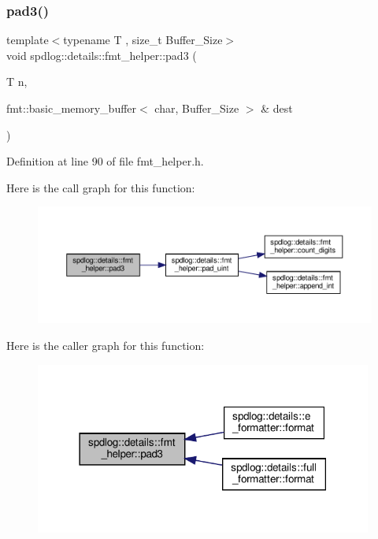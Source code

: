 \subsubsection{\texorpdfstring{pad3()}{pad3()}}
{\footnotesize\ttfamily template$<$typename T , size\+\_\+t Buffer\+\_\+\+Size$>$ \\
void spdlog\+::details\+::fmt\+\_\+helper\+::pad3 (\begin{DoxyParamCaption}\item[{T}]{n,  }\item[{fmt\+::basic\+\_\+memory\+\_\+buffer$<$ char, Buffer\+\_\+\+Size $>$ \&}]{dest }\end{DoxyParamCaption})\hspace{0.3cm}{\ttfamily [inline]}}



Definition at line 90 of file fmt\+\_\+helper.\+h.

Here is the call graph for this function\+:
\nopagebreak
\begin{figure}[H]
\begin{center}
\leavevmode
\includegraphics[width=350pt]{namespacespdlog_1_1details_1_1fmt__helper_af739ecce102d47ff08a0f344a96897d9_cgraph}
\end{center}
\end{figure}
Here is the caller graph for this function\+:
\nopagebreak
\begin{figure}[H]
\begin{center}
\leavevmode
\includegraphics[width=314pt]{namespacespdlog_1_1details_1_1fmt__helper_af739ecce102d47ff08a0f344a96897d9_icgraph}
\end{center}
\end{figure}
\mbox{\label{namespacespdlog_1_1details_1_1fmt__helper_aefae60b1ebdae78bc8f11c26b36b2cd6}} 
